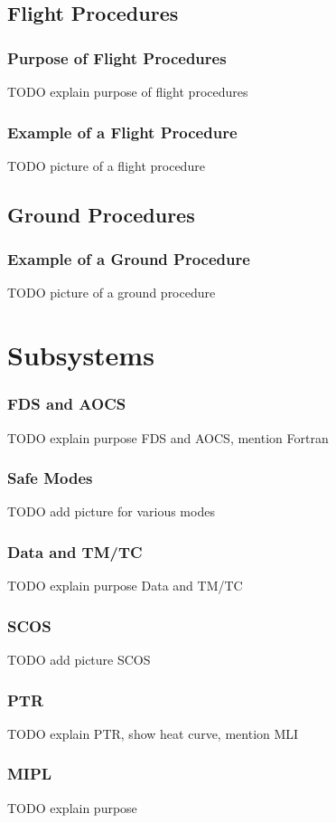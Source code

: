 \documentclass[12pt,utf8,notheorems,compress]{beamer}
\begin{document}
\subsection{Flight Procedures}

\begin{frame}
  \frametitle{Purpose of Flight Procedures}
  \pause
  TODO explain purpose of flight procedures
\end{frame}

\begin{frame}
  \frametitle{Example of a Flight Procedure}
  \pause
  TODO picture of a flight procedure
\end{frame}

\subsection{Ground Procedures}

\begin{frame}
  \frametitle{Example of a Ground Procedure}
  \pause
  TODO picture of a ground procedure
\end{frame}

\section{Subsystems}

\begin{frame}
  \frametitle{FDS and AOCS}
  \pause
  TODO explain purpose FDS and AOCS, mention Fortran
\end{frame}

\begin{frame}
  \frametitle{Safe Modes}
  \pause
  TODO add picture for various modes
\end{frame}

\begin{frame}
  \frametitle{Data and TM/TC}
  \pause
  TODO explain purpose Data and TM/TC
\end{frame}

\begin{frame}
  \frametitle{SCOS}
  \pause
  TODO add picture SCOS
\end{frame}

\begin{frame}
  \frametitle{PTR}
  \pause
  TODO explain PTR, show heat curve, mention MLI
\end{frame}

\begin{frame}
  \frametitle{MIPL}
  \pause
  TODO explain purpose
\end{frame}
\end{document}
